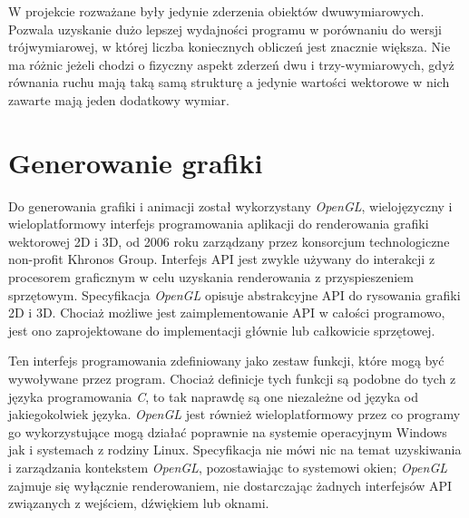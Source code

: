 \documentclass[12pt, letterpaper]{report}
\begin{document}
    W projekcie rozważane były jedynie zderzenia obiektów dwuwymiarowych. Pozwala uzyskanie dużo lepszej
    wydajności programu w porównaniu do wersji trójwymiarowej, w której liczba koniecznych obliczeń jest
    znacznie większa. Nie ma różnic jeżeli chodzi o fizyczny aspekt zderzeń dwu i trzy-wymiarowych, gdyż 
    równania ruchu mają taką samą strukturę a jedynie wartości wektorowe w nich zawarte mają jeden
    dodatkowy wymiar.
    
    \section{Generowanie grafiki}
    Do generowania grafiki i animacji został wykorzystany \emph{\emph{OpenGL}}, 
    wielojęzyczny i wieloplatformowy 
    interfejs programowania aplikacji do renderowania grafiki wektorowej 2D i 3D, 
    od 2006 roku zarządzany przez konsorcjum technologiczne non-profit Khronos Group. 
    Interfejs API jest zwykle używany do interakcji 
    z procesorem graficznym w celu uzyskania renderowania z przyspieszeniem sprzętowym. 
    Specyfikacja \emph{OpenGL} opisuje abstrakcyjne API do rysowania grafiki 2D i 3D. Chociaż możliwe jest 
    zaimplementowanie API w całości programowo, jest ono zaprojektowane do implementacji głównie 
    lub całkowicie sprzętowej.

    Ten interfejs programowania zdefiniowany jako zestaw funkcji, które mogą być wywoływane przez program.
    Chociaż definicje tych funkcji są podobne do tych z języka programowania \emph{C}, to tak 
    naprawdę są one niezależne od języka od jakiegokolwiek języka. 
    \emph{OpenGL} jest również wieloplatformowy przez co programy go wykorzystujące mogą 
    działać poprawnie na systemie operacyjnym Windows jak i systemach z rodziny Linux. 
    Specyfikacja nie mówi nic na temat uzyskiwania i zarządzania kontekstem \emph{OpenGL}, 
    pozostawiając to systemowi okien; \emph{OpenGL} zajmuje się wyłącznie 
    renderowaniem, nie dostarczając żadnych interfejsów API związanych z wejściem, dźwiękiem lub oknami. \\
\end{document}
